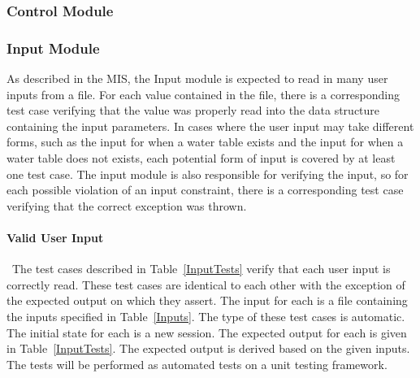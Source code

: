 \documentclass[12pt, titlepage]{article}
\begin{document}
\subsubsection{Control Module}


\subsubsection{Input Module}

As described in the MIS, the Input module is expected to read in many user 
inputs from a file. For each value contained in the file, there is a 
corresponding test case verifying that the value was properly read into the 
data structure containing the input parameters. In cases where the user input 
may take different forms, such as the input for when a water table exists and 
the input for when a water table does not exists, each potential form of input 
is covered by at least one test case. The input module is also responsible for 
verifying the input, so for each possible violation of an input constraint, 
there is a corresponding test case verifying that the correct exception was 
thrown.

\paragraph{Valid User Input}

~\newline \noindent The test cases described in Table~\ref{InputTests} 
verify that each user input is correctly read. These test cases are identical 
to each other with the exception of the expected output on which they assert. 
The input for each is a file containing the inputs specified in 
Table~\ref{Inputs}. The type 
of these test cases is automatic. The initial state for each is a new session. 
The expected output for each is given in Table~\ref{InputTests}. The expected 
output is derived based on the given inputs. The tests will be performed as 
automated tests on a unit testing framework.
\end{document}
